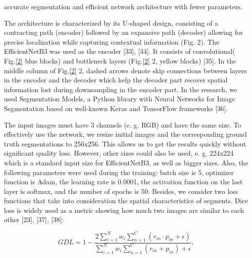 \documentclass{article}
\date{}
\begin{document}
\begin{multicols}{2}
\noindent accurate segmentation and efficient network architecture
with fewer parameters. 

The architecture is characterized by its U-shaped design, consisting of a contracting path (encoder) followed
by an expansive path (decoder) allowing for precise localization while capturing contextual information (Fig. 2).
The EfficientNetB3 was used as the encoder [33], [34].
It consists of convolutional( Fig.\ref{2} blue blocks) and bottleneck layers (Fig.\ref{2} 2, yellow blocks) [35]. In the middle
column of Fig.\ref{2} 2, dashed arrows denote skip connections
between layers in the encoder and the decoder which help
the decoder part recover spatial information lost during
downsampling in the encoder part. In the research, we
used Segmentation Models, a Python library with Neural
Networks for Image Segmentation based on well-known
Keras and TensorFlow frameworks [36].

The input images must have 3 channels (e. g. RGB)
and have the same size. To effectively use the network,
we resize initial images and the corresponding ground
truth segmentations to 256x256. This allows us to get the
results quickly without significant quality loss. However,
other sizes could also be used, e. g. 224x224 which is a
standard input size for EfficientNetB3, as well as bigger
sizes. Also, the following parameters were used during
the training: batch size is 5, optimizer function is Adam,
the learning rate is 0.0001, the activation function on the
last layer is softmax, and the number of epochs is 50.
Besides, we consider two loss functions that take
into consideration the spatial characteristics of segments.
Dice loss is widely used as a metric showing how much
two images are similar to each other [23], [37], [38]:

       \vspace{2mm}
\begin{centering}
\begin{equation}
    GDL = 1 - \frac{2 \sum_{i=1}^{N} w_i \sum_{n=1}^{C} (r_{in} \cdot p_{in} + \epsilon)}{ \sum_{i=1}^{N} w_i \sum_{n=1}^{C} (r_{in} + p_{in}) + \epsilon},
    \end{equation}
\end{centering}
  \vspace{2mm} 
  

\end{multicols}
\end{document}

